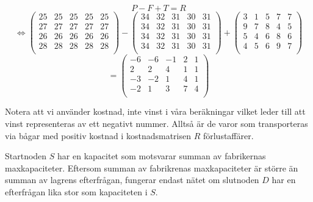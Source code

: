 \documentclass[titlepage, a4paper]{article}
\begin{document}
\begin{displaymath}
P - F + T = R
\end{displaymath}
\begin{displaymath}
\Leftrightarrow
\begin{pmatrix}
     {25} & {25} & {25} & {25} & {25} \\
     {27} & {27} & {27} & {27} & {27} \\
     {26} & {26} & {26} & {26} & {26} \\
     {28} & {28} & {28} & {28} & {28} \\
\end{pmatrix}
-
\begin{pmatrix}
    {34} & {32} & {31} & {30} & {31} \\
    {34} & {32} & {31} & {30} & {31} \\
    {34} & {32} & {31} & {30} & {31} \\
    {34} & {32} & {31} & {30} & {31} \\
\end{pmatrix}
+
\begin{pmatrix}
    {3} & {1} & {5} & {7} & {7} \\
    {9} & {7} & {8} & {4} & {5} \\
    {5} & {4} & {6} & {8} & {6} \\
    {4} & {5} & {6} & {9} & {7} \\
\end{pmatrix}
\end{displaymath}
\begin{displaymath}
=
\begin{pmatrix}
    {-6} & {-6} & {-1} & {2} & {1} \\
    {2} & {2} & {4} & {1} & {1} \\
    {-3} & {-2} & {1} & {4} & {1} \\
    {-2} & {1} & {3} & {7} & {4} \\
\end{pmatrix}
\end{displaymath}

Notera att vi använder kostnad, inte vinst i våra beräkningar vilket leder till att vinst representeras av ett negativt nummer. Alltså är de varor som transporteras via bågar med positiv kostnad i kostnadsmatrisen $R$ förlustaffärer.

Startnoden $S$ har en kapacitet som motsvarar summan av fabrikernas maxkapaciteter. Eftersom summan av fabrikrenas maxkapaciteter är större än summan av lagrens efterfrågan, fungerar endast nätet om slutnoden $D$ har en efterfrågan lika stor som kapaciteten i $S$.
\end{document}
